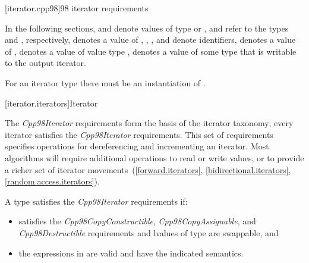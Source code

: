 \begin{addedblock}
[iterator.cpp98]{\Cpp{}98 iterator requirements}

\pnum
{}

\pnum
In the following sections,
and
denote values of type
 or ,
 and  refer to the
types  and
, respectively,
denotes a value of
,
,
,
and
denote identifiers,
denotes a value of
,
denotes a value of value type
,
denotes a value of some type that is writable to the output iterator.
\begin{note} For an iterator type  there must be an instantiation
of . \end{note}

\end{addedblock}

[iterator.iterators]{Iterator}

\pnum
The \textit{Cpp98Iterator} requirements form the basis of the iterator
taxonomy; every iterator satisfies the \textit{Cpp98Iterator} requirements. This
set of requirements specifies operations for dereferencing and incrementing
an iterator. Most algorithms will require additional operations to
read or write values, or
to provide a richer set of iterator movements~(\ref{forward.iterators},
\ref{bidirectional.iterators}, \ref{random.access.iterators}).

\pnum
A type  satisfies the \textit{Cpp98Iterator} requirements if:

\begin{itemize}
\item {} satisfies the \textit{Cpp98CopyConstructible}, \textit{Cpp98CopyAssignable}, and
\textit{Cpp98Destructible} requirements and lvalues
of type  are swappable, and

\item the expressions in  are valid and have
the indicated semantics.
\end{itemize}

